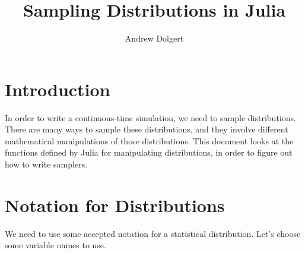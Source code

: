 \documentclass{article}
\title{Sampling Distributions in Julia}
\author{Andrew Dolgert}
\begin{document}
\maketitle

\section{Introduction}

In order to write a continuous-time simulation, we need to sample distributions. There are many ways to sample these distributions, and they involve different mathematical manipulations of those distributions. This document looks at the functions defined by Julia for manipulating distributions, in order to figure out how to write samplers.


\section{Notation for Distributions}\label{sec:notation}%

We need to use some accepted notation for a statistical distribution. Let's choose some variable names to use.
\end{document}
